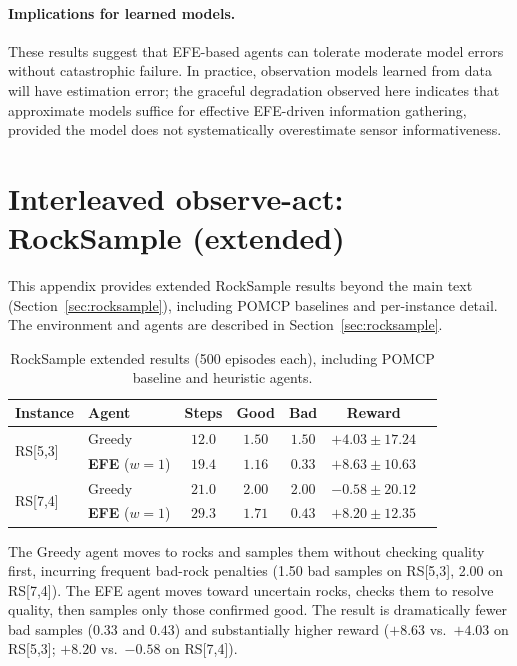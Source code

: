 \documentclass[runningheads]{llncs}
\begin{document}
\paragraph{Implications for learned models.} These results suggest that EFE-based agents can tolerate moderate model errors without catastrophic failure. In practice, observation models learned from data will have estimation error; the graceful degradation observed here indicates that approximate models suffice for effective EFE-driven information gathering, provided the model does not systematically overestimate sensor informativeness.

\section{Interleaved observe-act: RockSample (extended)}
\label{app:rocksample}

This appendix provides extended RockSample results beyond the main text (Section~\ref{sec:rocksample}), including POMCP baselines and per-instance detail. The environment and agents are described in Section~\ref{sec:rocksample}.

\begin{table}[h]
\centering
\caption{RockSample extended results (500 episodes each), including POMCP baseline and heuristic agents.}
\label{tab:rocksample_extended}
\begin{small}
\begin{tabular}{llccccc}
\toprule
Instance & Agent & Steps & Good & Bad & Reward \\
\midrule
\multirow{2}{*}{RS[5,3]} & Greedy & $12.0$ & $1.50$ & $1.50$ & $+4.03 \pm 17.24$ \\
& \textbf{EFE} ($w{=}1$) & $19.4$ & $1.16$ & $\mathbf{0.33}$ & $\mathbf{+8.63 \pm 10.63}$ \\
\midrule
\multirow{2}{*}{RS[7,4]} & Greedy & $21.0$ & $2.00$ & $2.00$ & $-0.58 \pm 20.12$ \\
& \textbf{EFE} ($w{=}1$) & $29.3$ & $1.71$ & $\mathbf{0.43}$ & $\mathbf{+8.20 \pm 12.35}$ \\
\bottomrule
\end{tabular}
\end{small}
\end{table}

The Greedy agent moves to rocks and samples them without checking quality first, incurring frequent bad-rock penalties (1.50 bad samples on RS[5,3], 2.00 on RS[7,4]). The EFE agent moves toward uncertain rocks, checks them to resolve quality, then samples only those confirmed good. The result is dramatically fewer bad samples ($0.33$ and $0.43$) and substantially higher reward ($+8.63$ vs.\ $+4.03$ on RS[5,3]; $+8.20$ vs.\ $-0.58$ on RS[7,4]).
\end{document}

